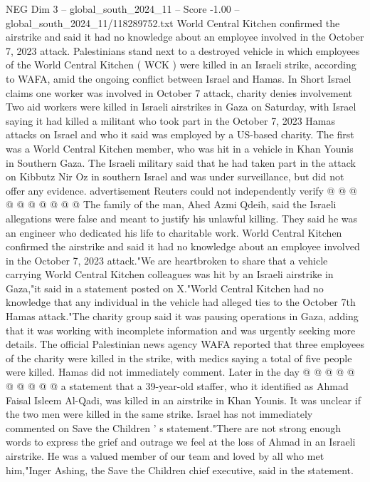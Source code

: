 \begin{textsample}{NEG Dim 3 – global\_south\_2024\_11 – Score -1.00 – global\_south\_2024\_11/118289752.txt}  \label{ex:f3_neg_135}
World Central Kitchen confirmed the airstrike and said it had no knowledge about an employee involved in the October 7, 2023 attack.
Palestinians stand next to a destroyed vehicle in which employees of the World Central Kitchen ( WCK ) were killed in an Israeli strike, according to WAFA, amid the ongoing conflict between Israel and Hamas.
In Short Israel claims one worker was involved in October 7 attack, charity denies involvement Two aid workers were killed in Israeli airstrikes in Gaza on Saturday, with Israel saying it had killed a militant who took part in the October 7, 2023 Hamas attacks on Israel and who it said was employed by a US-based charity.
The first was a World Central Kitchen member, who was hit in a vehicle in Khan Younis in Southern Gaza.
The Israeli military said that he had taken part in the attack on Kibbutz Nir Oz in southern Israel and was under surveillance, but did not offer any evidence. advertisement Reuters could not independently verify @ @ @ @ @ @ @ @ @ @ The family of the man, Ahed Azmi Qdeih, said the Israeli allegations were false and meant to justify his unlawful killing.
They said he was an engineer who dedicated his life to charitable work.
World Central Kitchen confirmed the airstrike and said it had no knowledge about an employee involved in the October 7, 2023 attack."We are heartbroken to share that a vehicle carrying World Central Kitchen colleagues was hit by an Israeli airstrike in Gaza,"it said in a statement posted on X."World Central Kitchen had no knowledge that any individual in the vehicle had alleged ties to the October 7th Hamas attack."The charity group said it was pausing operations in Gaza, adding that it was working with incomplete information and was urgently seeking more details.
The official Palestinian news agency WAFA reported that three employees of the charity were killed in the strike, with medics saying a total of five people were killed.
Hamas did not immediately comment.
Later in the day @ @ @ @ @ @ @ @ @ @ a statement that a 39-year-old staffer, who it identified as Ahmad Faisal Isleem Al-Qadi, was killed in an airstrike in Khan Younis.
It was unclear if the two men were killed in the same strike.
Israel has not immediately commented on Save the Children ' s statement."There are not strong enough words to express the grief and outrage we feel at the loss of Ahmad in an Israeli airstrike.
He was a valued member of our team and loved by all who met him,"Inger Ashing, the Save the Children chief executive, said in the statement.

\end{textsample}
